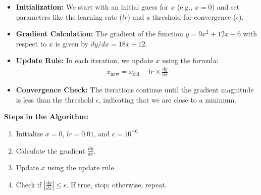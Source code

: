 \documentclass[article]{IEEEtran}
\numberwithin{figure}{enumi}
\begin{document}
\begin{itemize}
    \item \textbf{Initialization:} We start with an initial guess for $x$ (e.g., $x = 0$) and set parameters like the learning rate ($lr$) and a threshold for convergence ($\epsilon$).
    \item \textbf{Gradient Calculation:} The gradient of the function $y = 9x^2 + 12x + 6$ with respect to $x$ is given by $dy/dx = 18x + 12$.
    \item \textbf{Update Rule:} In each iteration, we update $x$ using the formula:
    \begin{align}
    x_{\text{new}} = x_{\text{old}} - lr \times \frac{dy}{dx}
    \end{align}
    \item \textbf{Convergence Check:} The iterations continue until the gradient magnitude is less than the threshold $\epsilon$, indicating that we are close to a minimum.
\end{itemize}

\noindent\textbf{Steps in the Algorithm:}

\begin{enumerate}
    \item Initialize $x = 0$, $lr = 0.01$, and $\epsilon = 10^{-6}$.
    \item Calculate the gradient $\frac{dy}{dx}$.
    \item Update $x$ using the update rule.
    \item Check if $|\frac{dy}{dx}| \leq \epsilon$. If true, stop; otherwise, repeat.
\end{enumerate}
\end{document}
